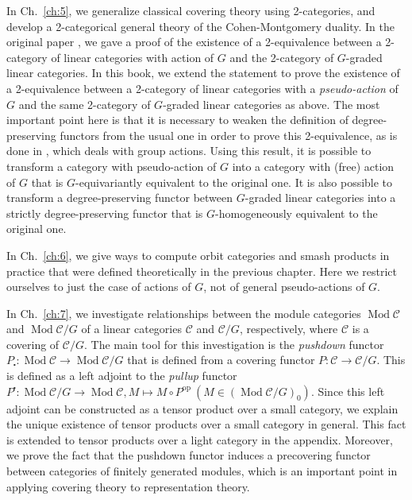 \documentclass{surv-l}
\numberwithin{equation}{chapter}
\numberwithin{figure}{chapter}
\theoremstyle{plain}
\theoremstyle{definition}
\theoremstyle{remark}
\DeclareMathOperator{\Mod}{Mod}
\begin{document}
In Ch.\ \ref{ch:5}, we generalize classical covering theory using 2-categories,
and develop a 2-categorical general theory of the Cohen-Montgomery duality.
In the original paper \cite{Asa11}, we gave a proof of the existence of a 2-equivalence
between a 2-category of linear categories with action of $G$
and the 2-category of $G$-graded linear categories.
In this book, we extend the statement to prove the existence
of a 2-equivalence between a 2-category of linear categories with a
{\em pseudo-action} of $G$ and the same 2-category of $G$-graded linear categories as above.
The most important point here is that it is necessary to weaken the definition of degree-preserving functors
from the usual one in order to prove this 2-equivalence, as is done in \cite{Asa11}, which deals with group actions.
Using this result, it is possible to transform a category with pseudo-action of $G$
into a category with (free) action of $G$ that is $G$-equivariantly equivalent to the
original one.
It is also possible to transform a degree-preserving functor between $G$-graded
linear categories into a strictly degree-preserving functor that is $G$-homogeneously equivalent to the original one.

In Ch.\  \ref{ch:6}, we give ways to compute orbit categories and smash products in practice that were
defined theoretically in the previous chapter.
Here we restrict ourselves to just the case of actions of $G$,
not of general pseudo-actions of $G$.

In Ch.\ \ref{ch:7}, we investigate relationships between the module categories $\Mod {\mathcal{C}}$ and
$\Mod {\mathcal{C}}/G$ of a linear categories ${\mathcal{C}}$ and ${\mathcal{C}}/G$, respectively, where
${\mathcal{C}}$ is a covering of ${\mathcal{C}}/G$.
The main tool for this investigation is the {\em pushdown} functor $P_{\centerdot} \colon \Mod {\mathcal{C}} \to \Mod {\mathcal{C}}/G$
that is defined from a covering functor $P \colon {\mathcal{C}} \to {\mathcal{C}}/G$.
This is defined as a left adjoint to the {\em pullup} functor
$P^{\centerdot} \colon \Mod {\mathcal{C}}/G \to \Mod {\mathcal{C}},
M \mapsto M\circ P^{\mathrm{op}}\ (M \in (\Mod {\mathcal{C}}/G)_0)$.
Since this left adjoint can be constructed as a tensor product over a small category,
we explain the unique existence of tensor products over a small category in general.
This fact is extended to tensor products over a light category in the appendix.
Moreover, we prove the fact that the pushdown functor induces a precovering functor between
categories of finitely generated modules, which is an important point in applying covering theory to representation theory.
\end{document}
